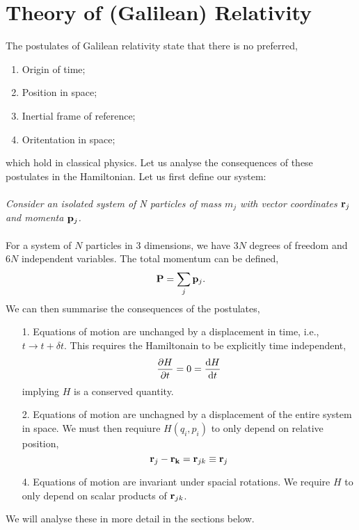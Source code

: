 \documentclass{book}
\begin{document}
\section{Theory of (Galilean) Relativity}
The postulates of Galilean relativity state that there is no preferred,
\begin{enumerate}
	\item Origin of time;
	\item Position in space;
	\item Inertial frame of reference;
	\item Oritentation in space;
\end{enumerate}
which hold in classical physics. Let us analyse the consequences of these postulates in the Hamiltonian. Let us first define our system:
\\\\
\textit{Consider an isolated system of N particles of mass $m_j$ with vector coordinates $\vb{r}_j$ and momenta $\vb{p}_j$.}
\\\\
For a system of $N$ particles in 3 dimensions, we have $3N$ degrees of freedom and $6N$ independent variables. The total momentum can be defined,
\begin{equation}
	\vb{P} = \sum_j\vb{p}_j.
\end{equation}
We can then summarise the consequences of the postulates,
\begin{enumerate}
	\item[1.] Equations of motion are unchanged by a displacement in time, i.e., $t \to t + \delta t$. This requires the Hamiltonain to be explicitly time independent,
	\begin{equation}
		\pdv{H}{t} = 0 = \dv{H}{t}
	\end{equation}
	implying $H$ is a conserved quantity.
	\item[2.] Equations of motion are unchagned by a displacement of the entire system in space. We must then requiure $H(q_i,p_i)$ to only depend on relative position,
	\begin{equation}
		\vb{r}_j - \vb{r_k} = \vb{r}_{jk} \equiv \vb{r}_j
	\end{equation}
	\item[4.] Equations of motion are invariant under spacial rotations. We require $H$ to only depend on scalar products of $\vb{r}_{jk}$.
\end{enumerate}
We will analyse these in more detail in the sections below.
\end{document}
